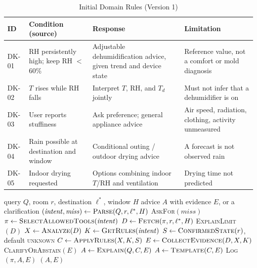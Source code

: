 \documentclass[conference]{IEEEtran}
\begin{document}
\begin{table}[t]
\caption{Initial Domain Rules (Version 1)}
\label{tab:rules}
\centering
\footnotesize
\setlength{\tabcolsep}{3pt}
\begin{tabular}{@{}>{\raggedright}p{0.85cm}>{\raggedright}p{2.45cm}>{\raggedright}p{2.15cm}>{\raggedright\arraybackslash}p{2.45cm}@{}}
\toprule
ID & Condition (source) & Response & Limitation \\
\midrule
DK-01 & RH persistently high; keep RH $<$60\%~\cite{epa_mold} & Adjustable dehumidification advice, given trend and device state & Reference value, not a comfort or mold diagnosis \\
DK-02 & $T$ rises while RH falls~\cite{nws_dewpoint} & Interpret $T$, RH, and $T_d$ jointly & Must not infer that a dehumidifier is on \\
DK-03 & User reports stuffiness~\cite{ashrae55,mishra2026myths} & Ask preference; general appliance advice & Air speed, radiation, clothing, activity unmeasured \\
DK-04 & Rain possible at destination and window~\cite{cwa_township} & Conditional outing / outdoor drying advice & A forecast is not observed rain \\
DK-05 & Indoor drying requested & Options combining indoor $T$/RH and ventilation & Drying time not predicted \\
\bottomrule
\end{tabular}
\end{table}

\begin{algorithm}[t]
\caption{Advice Path}
\label{alg:advice}
\small
\begin{algorithmic}[1]
\Require query $Q$, room $r$, destination $\ell^\ast$, window $H$
\Ensure advice $A$ with evidence $E$, or a clarification
\State $(\mathit{intent},\mathit{miss})\gets\textsc{Parse}(Q,r,\ell^\ast,H)$ 
 \Return \textsc{AskFor}$(\mathit{miss})$ \EndIf
\State $\pi\gets\textsc{SelectAllowedTools}(\mathit{intent})$ 
\State $D\gets\textsc{Fetch}(\pi,r,\ell^\ast,H)$ 
 \Return \textsc{ExplainLimit}$(D)$ \EndIf
\State $X\gets\textsc{Analyze}(D)$ 
\State $K\gets\textsc{GetRules}(\mathit{intent})$ 
\State $S\gets\textsc{ConfirmedState}(r)$, default \textsc{unknown}
\State $C\gets\textsc{ApplyRules}(X,K,S)$ 
\State $E\gets\textsc{CollectEvidence}(D,X,K)$
 \Return \textsc{ClarifyOrAbstain}$(E)$ \EndIf
\State $A\gets\textsc{Explain}(Q,C,E)$ 
 $A\gets\textsc{Template}(C,E)$ \EndIf
\State \textsc{Log}$(\pi,A,E)$
\State \Return $(A,E)$
\end{algorithmic}
\end{algorithm}
\end{document}
